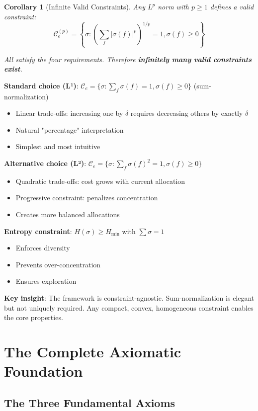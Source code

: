 \documentclass[11pt,a4paper]{article}
\newtheorem{corollary}[theorem]{Corollary}
\theoremstyle{definition}
\theoremstyle{remark}
\newcommand{\C}{\mathcal{C}}
\begin{document}
\begin{corollary}[Infinite Valid Constraints]
Any $L^p$ norm with $p \ge 1$ defines a valid constraint:
\[ \C_e^{(p)} = \left\{\sigma : \left(\sum_f |\sigma(f)|^p\right)^{1/p} = 1, \sigma(f) \ge 0\right\} \]

All satisfy the four requirements. Therefore \textbf{infinitely many valid constraints exist}.
\end{corollary}

\textbf{Standard choice (L¹)}: $\C_e = \{\sigma : \sum_f \sigma(f) = 1, \sigma(f) \ge 0\}$ (sum-normalization)
\begin{itemize}
\item Linear trade-offs: increasing one by $\delta$ requires decreasing others by exactly $\delta$
\item Natural "percentage" interpretation
\item Simplest and most intuitive
\end{itemize}

\textbf{Alternative choice (L²)}: $\C_e = \{\sigma : \sum_f \sigma(f)^2 = 1, \sigma(f) \ge 0\}$
\begin{itemize}
\item Quadratic trade-offs: cost grows with current allocation
\item Progressive constraint: penalizes concentration
\item Creates more balanced allocations
\end{itemize}

\textbf{Entropy constraint}: $H(\sigma) \ge H_{\min}$ with $\sum \sigma = 1$
\begin{itemize}
\item Enforces diversity
\item Prevents over-concentration
\item Ensures exploration
\end{itemize}

\textbf{Key insight}: The framework is constraint-agnostic. Sum-normalization is elegant but not uniquely required. Any compact, convex, homogeneous constraint enables the core properties.

\section{The Complete Axiomatic Foundation}

\subsection{The Three Fundamental Axioms}
\end{document}
